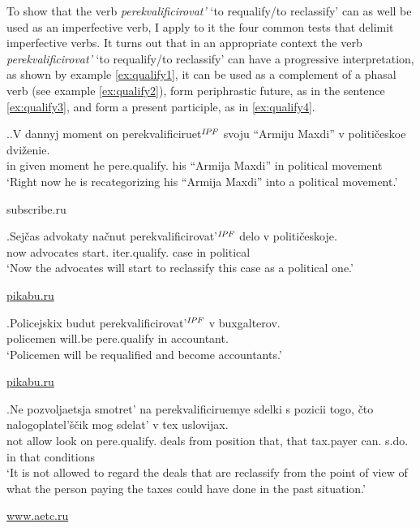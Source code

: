 To show that the verb \textit{perekvalificirovat'} `to requalify/to reclassify' can as well be used as an imperfective verb, I apply to it the four common tests that delimit imperfective verbs. It turns out that in an appropriate context the verb \textit{perekvalificirovat'} `to requalify/to reclassify' can have a progressive interpretation, as shown by example \ref{ex:qualify1}, it can be used as a complement of a phasal verb (see example \ref{ex:qualify2}), form periphrastic future, as in the sentence \ref{ex:qualify3}, and form a present participle, as in \ref{ex:qualify4}. 

\ex.\label{ex:qualify}\ag.\label{ex:qualify1}V dannyj moment on perekvalificiruet$^{\mathit{IPF}}$ svoju {``Armiju Maxdi''} v politi\v{c}eskoe dvi\v{z}enie.\\
in given moment he pere.qualify. his {``Armija Maxdi''} in political movement\\
\vspace{0.5em}
`Right now he is recategorizing his ``Armija Maxdi'' into a political movement.' 
\begin{flushright}
\vspace{-0.5em}
subscribe.ru
\end{flushright}
\bg.\label{ex:qualify2}Sej\v{c}as advokaty na\v{c}nut perekvalificirovat'$^{\mathit{IPF}}$ delo v politi\v{c}eskoje.\\
now advocates start. iter.qualify. case in political\\
\vspace{0.5em}
`Now the advocates will start to reclassify this case as a political one.'
\begin{flushright}
\vspace{-0.5em}
\url{pikabu.ru}
\end{flushright}
\bg.\label{ex:qualify3}Policejskix budut perekvalificirovat'$^{\mathit{IPF}}$ v buxgalterov.\\	
policemen will.be pere.qualify in accountant.\\
\vspace{0.5em}
`Policemen will be requalified and become accountants.'
\begin{flushright}
\vspace{-0.5em}
\url{pikabu.ru}
\end{flushright}
\bg.\label{ex:qualify4}Ne pozvoljaetsja smotret’ na perekvalificiruemye sdelki s pozicii togo, \v{c}to nalogoplatel’\v{s}\v{c}ik mog sdelat’ v tex uslovijax.\\
not allow look on pere.qualify. deals from position that, that tax.payer can. s.do. in that conditions\\
\vspace{0.5em}
`It is not allowed to regard the deals that are reclassify from the point of view of what the person paying the taxes could have done in the past situation.'
\begin{flushright}
\vspace{-0.5em}
\url{www.aetc.ru}
\end{flushright}

